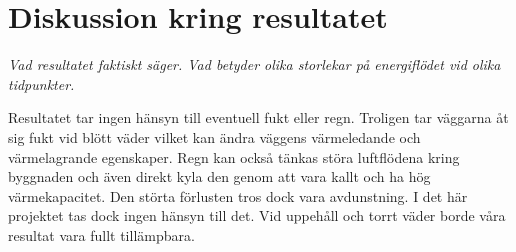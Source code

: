 \section{Diskussion kring resultatet}

\emph{\color{red} Vad resultatet faktiskt säger. Vad betyder olika storlekar på energiflödet vid olika tidpunkter.}

Resultatet tar ingen hänsyn till eventuell fukt eller regn. Troligen tar väggarna åt sig fukt vid blött väder vilket kan ändra väggens värmeledande och värmelagrande egenskaper. Regn kan också tänkas störa luftflödena kring byggnaden och även direkt kyla den genom att vara kallt och ha hög värmekapacitet. Den störta förlusten tros dock vara avdunstning. I det här projektet tas dock ingen hänsyn till det. Vid uppehåll och torrt väder borde våra resultat vara fullt tillämpbara.